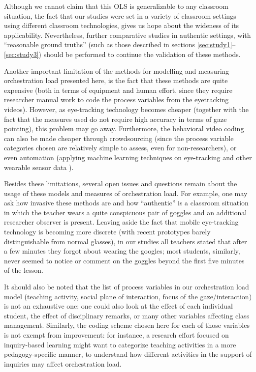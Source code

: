 \documentclass[10pt,journal,compsoc]{IEEEtran}
\begin{document}
Although we cannot claim that this OLS is generalizable to any classroom situation, the fact that our studies were set in a variety of classroom settings using different classroom technologies, gives us hope about the wideness of its applicability. Nevertheless, further comparative studies in authentic settings, with ``reasonable ground truths'' (such as those described in sections \ref{sec:study1}--\ref{sec:study3}) should be performed to continue the validation of these methods.

Another important limitation of the methods for modelling and measuring orchestration load presented here, is the fact that these methods are quite expensive (both in terms of equipment and human effort, since they require researcher manual work to code the process variables from the eyetracking videos). However, as eye-tracking technology becomes cheaper (together with the fact that the measures used do not require high accuracy in terms of gaze pointing), this problem may go away. Furthermore, the behavioral video coding can also be made cheaper through crowdsourcing (since the process variable categories chosen are relatively simple to assess, even for non-researchers), or even automation (applying machine learning techniques on eye-tracking and other wearable sensor data \cite{prieto2016teaching}).

Besides these limitations, several open issues and questions remain about the usage of these models and measures of orchestration load. For example, one may ask how invasive these methods are and how ``authentic'' is a classroom situation in which the teacher wears a quite conspicuous pair of goggles and an additional researcher observer is present. Leaving aside the fact that mobile eye-tracking technology is becoming more discrete (with recent prototypes barely distinguishable from normal glasses), in our studies all teachers stated that after a few minutes they forgot about wearing the googles; most students, similarly, never seemed to notice or comment on the goggles beyond the first five minutes of the lesson.

It should also be noted that the list of process variables in our orchestration load model (teaching activity, social plane of interaction, focus of the gaze/interaction) is not an exhaustive one: one could also look at the effect of each individual student, the effect of disciplinary remarks, or many other variables affecting class management. Similarly, the coding scheme chosen here for each of those variables is not exempt from improvement: for instance, a research effort focused on inquiry-based learning might want to categorize teaching activities in a more pedagogy-specific manner, to understand how different activities in the support of inquiries may affect orchestration load.
\end{document}
